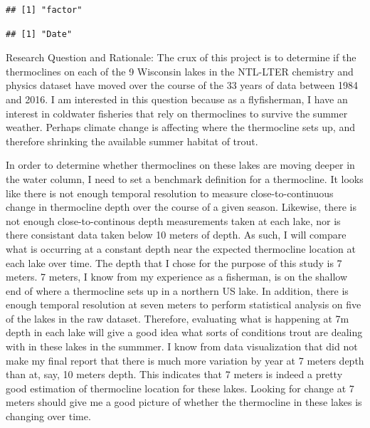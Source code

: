 \documentclass[12pt,]{article}
\newenvironment{Shaded}{\begin{snugshade}}{\end{snugshade}}
\newcommand{\KeywordTok}[1]{\textcolor[rgb]{0.13,0.29,0.53}{\textbf{#1}}}
\newcommand{\DataTypeTok}[1]{\textcolor[rgb]{0.13,0.29,0.53}{#1}}
\newcommand{\StringTok}[1]{\textcolor[rgb]{0.31,0.60,0.02}{#1}}
\newcommand{\OperatorTok}[1]{\textcolor[rgb]{0.81,0.36,0.00}{\textbf{#1}}}
\newcommand{\NormalTok}[1]{#1}
\begin{document}
\begin{verbatim}
## [1] "factor"
\end{verbatim}

\begin{Shaded}
\end{Shaded}

\begin{verbatim}
## [1] "Date"
\end{verbatim}

Research Question and Rationale: The crux of this project is to
determine if the thermoclines on each of the 9 Wisconsin lakes in the
NTL-LTER chemistry and physics dataset have moved over the course of the
33 years of data between 1984 and 2016. I am interested in this question
because as a flyfisherman, I have an interest in coldwater fisheries
that rely on thermoclines to survive the summer weather. Perhaps climate
change is affecting where the thermocline sets up, and therefore
shrinking the available summer habitat of trout.

In order to determine whether thermoclines on these lakes are moving
deeper in the water column, I need to set a benchmark definition for a
thermocline. It looks like there is not enough temporal resolution to
measure close-to-continuous change in thermocline depth over the course
of a given season. Likewise, there is not enough close-to-continous
depth measurements taken at each lake, nor is there consistant data
taken below 10 meters of depth. As such, I will compare what is
occurring at a constant depth near the expected thermocline location at
each lake over time. The depth that I chose for the purpose of this
study is 7 meters. 7 meters, I know from my experience as a fisherman,
is on the shallow end of where a thermocline sets up in a northern US
lake. In addition, there is enough temporal resolution at seven meters
to perform statistical analysis on five of the lakes in the raw dataset.
Therefore, evaluating what is happening at 7m depth in each lake will
give a good idea what sorts of conditions trout are dealing with in
these lakes in the summmer. I know from data visualization that did not
make my final report that there is much more variation by year at 7
meters depth than at, say, 10 meters depth. This indicates that 7 meters
is indeed a pretty good estimation of thermocline location for these
lakes. Looking for change at 7 meters should give me a good picture of
whether the thermocline in these lakes is changing over time.
\end{document}
